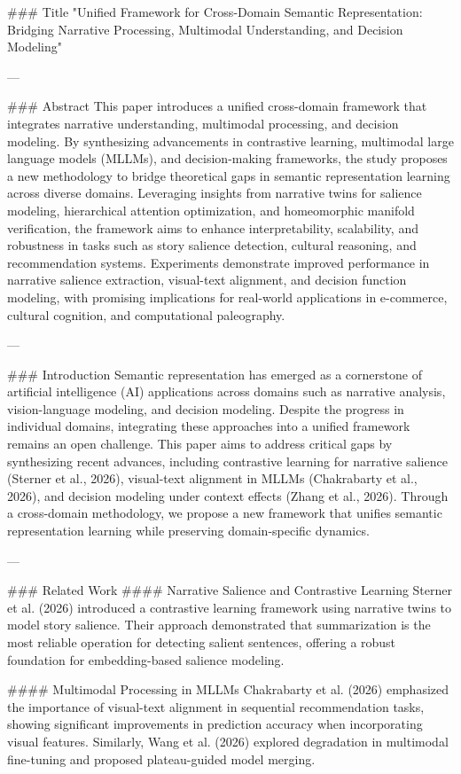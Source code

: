 ### Title
"Unified Framework for Cross-Domain Semantic Representation: Bridging Narrative Processing, Multimodal Understanding, and Decision Modeling"

---

### Abstract
This paper introduces a unified cross-domain framework that integrates narrative understanding, multimodal processing, and decision modeling. By synthesizing advancements in contrastive learning, multimodal large language models (MLLMs), and decision-making frameworks, the study proposes a new methodology to bridge theoretical gaps in semantic representation learning across diverse domains. Leveraging insights from narrative twins for salience modeling, hierarchical attention optimization, and homeomorphic manifold verification, the framework aims to enhance interpretability, scalability, and robustness in tasks such as story salience detection, cultural reasoning, and recommendation systems. Experiments demonstrate improved performance in narrative salience extraction, visual-text alignment, and decision function modeling, with promising implications for real-world applications in e-commerce, cultural cognition, and computational paleography.

---

### Introduction
Semantic representation has emerged as a cornerstone of artificial intelligence (AI) applications across domains such as narrative analysis, vision-language modeling, and decision modeling. Despite the progress in individual domains, integrating these approaches into a unified framework remains an open challenge. This paper aims to address critical gaps by synthesizing recent advances, including contrastive learning for narrative salience (Sterner et al., 2026), visual-text alignment in MLLMs (Chakrabarty et al., 2026), and decision modeling under context effects (Zhang et al., 2026). Through a cross-domain methodology, we propose a new framework that unifies semantic representation learning while preserving domain-specific dynamics.

---

### Related Work
#### Narrative Salience and Contrastive Learning
Sterner et al. (2026) introduced a contrastive learning framework using narrative twins to model story salience. Their approach demonstrated that summarization is the most reliable operation for detecting salient sentences, offering a robust foundation for embedding-based salience modeling.

#### Multimodal Processing in MLLMs
Chakrabarty et al. (2026) emphasized the importance of visual-text alignment in sequential recommendation tasks, showing significant improvements in prediction accuracy when incorporating visual features. Similarly, Wang et al. (2026) explored degradation in multimodal fine-tuning and proposed plateau-guided model merging.

